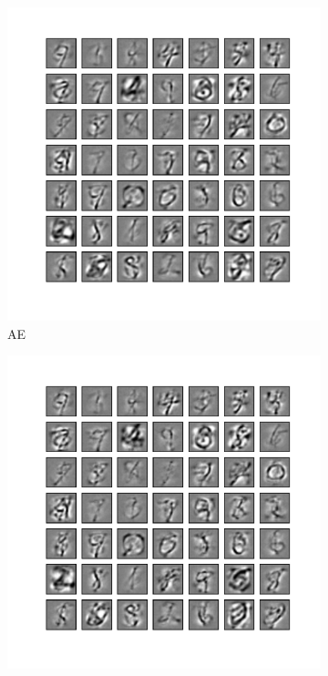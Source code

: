 \begin{figure}
	\centering
	\begin{subfigure}[t]{0.4\textwidth}
		\includegraphics[width=\textwidth]{pics_sdlm/22_MNIST_AE/2_60000_0.pdf}
		\caption{AE}
	\end{subfigure}
	\begin{subfigure}[t]{0.4\textwidth}
		\includegraphics[width=\textwidth]{pics_sdlm/23_MNIST_AE_noise/2_60000_0.pdf}

\end{subfigure}
\end{figure}
